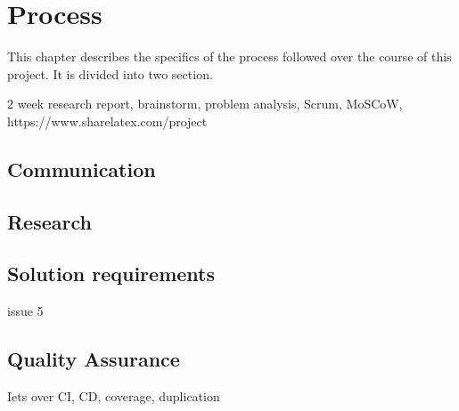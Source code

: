 \chapter{Process}

This chapter describes the specifics of the process followed over the course of this project. It is divided into two section. 


2 week research report, brainstorm,  problem analysis, Scrum, MoSCoW, 
https://www.sharelatex.com/project
\section{Communication}

\section{Research}

\section{Solution requirements}
issue 5

\section{Quality Assurance}
Iets over CI, CD, coverage, duplication
